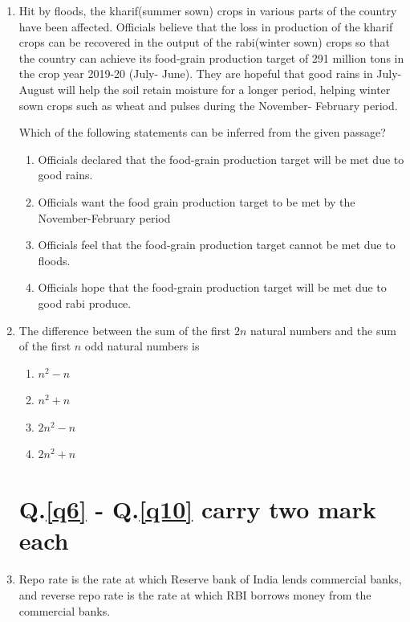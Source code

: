 \documentclass[journal,12pt,onecolumn]{IEEEtran}
\theoremstyle{remark}
\begin{document}
\begin{enumerate}
    \item Hit by floods, the kharif(summer sown) crops in various parts of the country have been affected. Officials believe that the loss in production of the kharif crops can be recovered in the output of the rabi(winter sown) crops so that the country can achieve its food-grain production target of 291 million tons in the crop year 2019-20 (July- June). They are hopeful that good rains in July-August will help the soil retain moisture for a longer period, helping winter sown crops such as wheat and pulses during the November- February period.

    Which of the following statements can be inferred from the given passage?
    \begin{enumerate}
        \item Officials declared that the food-grain production target will be met due to good rains.
        \item Officials want the food grain production target to be met by the November-February period
        \item Officials feel that the food-grain production target cannot be met due to floods.
        \item Officials hope that the food-grain production target will be met due to good rabi produce.
    \end{enumerate}

    \item \label{q5}The difference between the sum of the first $2n$ natural numbers and the sum of the first $n$ odd natural numbers is\underline{\hspace{2cm}}
    \begin{enumerate}
        \item $n^2 - n$
        \item $n^2 + n$
        \item $2n^2 - n$
        \item $2n^2 + n$
    \end{enumerate}

\section*{Q.\ref{q6} - Q.\ref{q10} carry two mark each}

\item \label{q6}Repo rate is the rate at which Reserve bank of India lends commercial banks, and reverse repo rate is the rate at which RBI borrows money from the commercial banks.


\end{enumerate}
\end{document}

